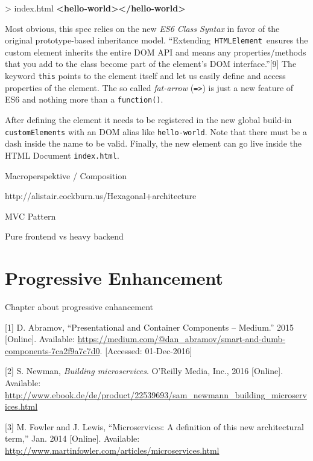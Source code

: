 \documentclass[]{assets/latex/ieee}
\newenvironment{Shaded}{}{}
\newcommand{\KeywordTok}[1]{\textcolor[rgb]{0.00,0.44,0.13}{\textbf{{#1}}}}
\newcommand{\NormalTok}[1]{{#1}}
\begin{document}
\begin{Shaded}
\begin{Highlighting}[]
\NormalTok{> index.html}
\KeywordTok{<hello-world></hello-world>}
\end{Highlighting}
\end{Shaded}

Most obvious, this spec relies on the new \emph{ES6 Class Syntax} in
favor of the original prototype-based inheritance model.
``Extending~\texttt{HTMLElement}~ensures the custom element inherits the
entire DOM API and means any properties/methods that you add to the
class become part of the element's DOM interface.''{[}9{]} The keyword
\texttt{this} points to the element itself and let us easily define and
access properties of the element. The so called \emph{fat-arrow}
(\texttt{=\textgreater{}}) is just a new feature of ES6 and nothing more
than a \texttt{function()}.

After defining the element it needs to be registered in the new global
build-in \texttt{customElements} with an DOM alias like
\texttt{hello-world}. Note that there must be a dash inside the name to
be valid. Finally, the new element can go live inside the HTML Document
\texttt{index.html}.

Macroperspektive / Composition

http://alistair.cockburn.us/Hexagonal+architecture

MVC Pattern

Pure frontend vs heavy backend

\section{Progressive Enhancement}\label{progressive-enhancement}

Chapter about progressive enhancement

\hypertarget{refs}{}
\hypertarget{ref-Abramov2015}{}
{[}1{]} D. Abramov, ``Presentational and Container Components --
Medium.'' 2015 {[}Online{]}. Available:
\url{https://medium.com/@dan_abramov/smart-and-dumb-components-7ca2f9a7c7d0}.
{[}Accessed: 01-Dec-2016{]}

\hypertarget{ref-Newman2015}{}
{[}2{]} S. Newman, \emph{Building microservices}. O'Reilly Media, Inc.,
2016 {[}Online{]}. Available:
\url{http://www.ebook.de/de/product/22539693/sam_newmann_building_microservices.html}

\hypertarget{ref-Fowler2014}{}
{[}3{]} M. Fowler and J. Lewis, ``Microservices: A definition of this
new architectural term,'' Jan. 2014 {[}Online{]}. Available:
\url{http://www.martinfowler.com/articles/microservices.html}
\end{document}

